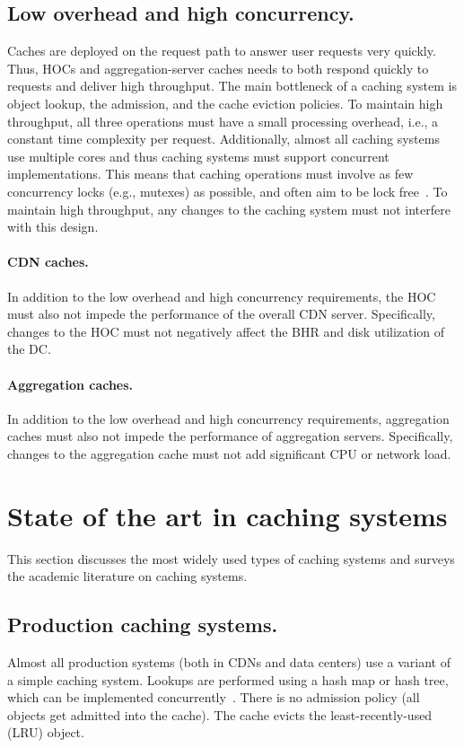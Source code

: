 \documentclass{article}
\begin{document}
\subsection{Low overhead and high concurrency.}
Caches are deployed on the request path to answer user requests very quickly.
Thus, HOCs and aggregation-server caches needs to both respond quickly to requests and deliver high throughput.
The main bottleneck of a caching system is object lookup, the admission, and the cache eviction policies.
To maintain high throughput, all three operations must have a small processing overhead, i.e., a constant time complexity per request.
Additionally, almost all caching systems use multiple cores and thus caching systems must support concurrent implementations.
This means that caching operations must involve as few concurrency locks (e.g., mutexes) as possible, and often aim to be lock free~\cite{li2015architecting,lim2014mica,fan2013memc3}.
To maintain high throughput, any changes to the caching system must not interfere with this design.

\paragraph{CDN caches.}
In addition to the low overhead and high concurrency requirements, the HOC must also not impede the performance of the overall CDN server.
Specifically, changes to the HOC must not negatively affect the BHR and disk utilization of the DC.

\paragraph{Aggregation caches.}
In addition to the low overhead and high concurrency requirements, aggregation caches must also not impede the performance of aggregation servers.
Specifically, changes to the aggregation cache must not add significant CPU or network load.



\section{State of the art in caching systems}\label{bg:priorwork:cachingsystems}
This section discusses the most widely used types of caching systems and surveys the academic literature on caching systems.

\subsection{Production caching systems.}
Almost all production systems (both in CDNs and data centers) use a variant of a simple caching system.
Lookups are performed using a hash map or hash tree, which can be implemented concurrently~\cite{kamp2010you}.
There is no admission policy (all objects get admitted into the cache).
The cache evicts the least-recently-used (LRU) object.
\end{document}
